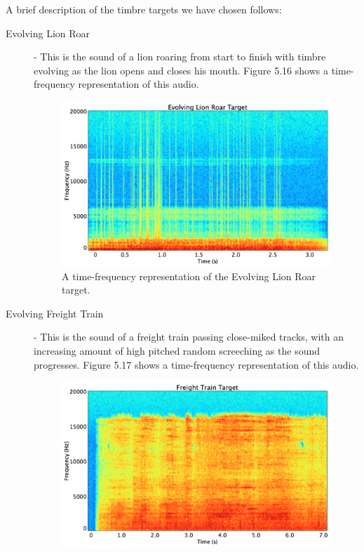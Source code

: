 \documentclass[a4paper,12pt]{report} 	%
\numberwithin{figure}{chapter}
\numberwithin{table}{chapter}
\numberwithin{equation}{chapter}
\begin{document}
\begin{flushleft}
A brief description of the timbre targets we have chosen follows:
\begin{description}
\item[Evolving Lion Roar] - This is the sound of a lion roaring from start to finish with timbre evolving as the lion opens and closes his mouth. Figure 5.16 shows a time-frequency representation of this audio.
\begin{figure}[h!]
\begin{center}
\includegraphics[scale=0.35,width=\linewidth]{EvolvingLionRoarTargetSTFT}
\caption[Evolving Lion Roar Time-Frequency Representation]{A time-frequency representation of the Evolving Lion Roar target.}
\end{center}
\end{figure}
\item[Evolving Freight Train] - This is the sound of a freight train passing close-miked tracks, with an increasing amount of high pitched random screeching as the sound progresses. Figure 5.17 shows a time-frequency representation of this audio.
\begin{figure}[h!]
\begin{center}
\includegraphics[scale=0.35,width=\linewidth]{FreightTrainTargetSTFT}

\end{center}
\end{figure}
\end{description}
\end{flushleft}
\end{document}
